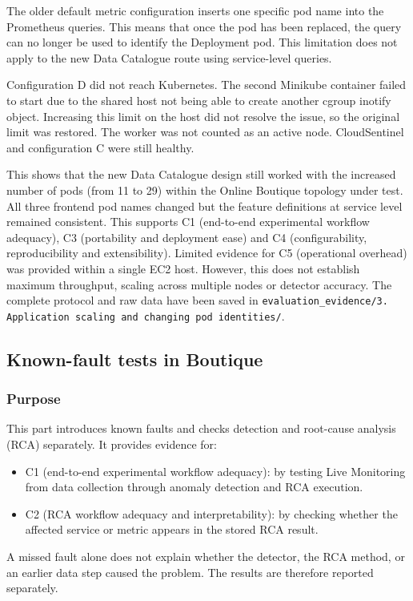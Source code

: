 The older default metric configuration inserts one specific pod name into the Prometheus queries. This means that once the pod has been replaced, the query can no longer be used to identify the Deployment pod. This limitation does not apply to the new Data Catalogue route using service-level queries.

Configuration D did not reach Kubernetes. The second Minikube container failed to start due to the shared host not being able to create another cgroup inotify object. Increasing this limit on the host did not resolve the issue, so the original limit was restored. The worker was not counted as an active node. CloudSentinel and configuration C were still healthy.

This shows that the new Data Catalogue design still worked with the increased number of pods (from 11 to 29) within the Online Boutique topology under test. All three frontend pod names changed but the feature definitions at service level remained consistent. This supports C1 (end-to-end experimental workflow adequacy), C3 (portability and deployment ease) and C4 (configurability, reproducibility and extensibility). Limited evidence for C5 (operational overhead) was provided within a single EC2 host. However, this does not establish maximum throughput, scaling across multiple nodes or detector accuracy. The complete protocol and raw data have been saved in \texttt{evaluation\_evidence/3. Application scaling and changing pod identities/}.

\subsection{Known-fault tests in Boutique}

\subsubsection{Purpose}

This part introduces known faults and checks detection and root-cause analysis (RCA) separately. It provides evidence for:
\begin{itemize}
    \item C1 (end-to-end experimental workflow adequacy): by testing Live Monitoring from data collection through anomaly detection and RCA execution.
    \item C2 (RCA workflow adequacy and interpretability): by checking whether the affected service or metric appears in the stored RCA result.
\end{itemize}
A missed fault alone does not explain whether the detector, the RCA method, or an earlier data step caused the problem. The results are therefore reported separately.

